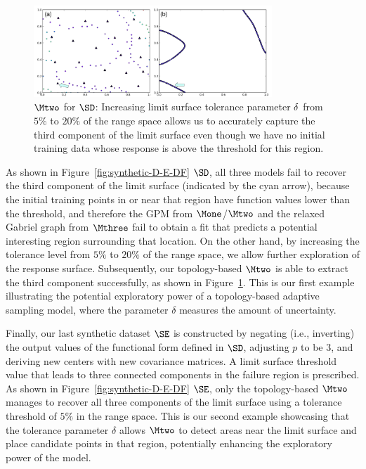 \begin{figure}[ht]
\centering
\includegraphics[width=0.8\textwidth]{figs/chap5/synthetic-D-20percent.pdf}
\caption{
$\protect\Mtwo$ for $\protect\SD$: Increasing limit surface tolerance parameter $\protect\delta$
from $5\%$ to $20\%$ of the range space allows us to accurately capture the third component of the limit surface even though we have no initial training data whose response is above the threshold for this region.
}
\label{fig:df-20percent}
\end{figure}

As shown in Figure~\ref{fig:synthetic-D-E-DF} $\SD$, all three models fail to recover the third component of the limit surface (indicated by the cyan arrow), because the initial training points in or near that region have function values lower than the threshold, and therefore the GPM from $\Mone$/$\Mtwo$ and the relaxed Gabriel graph from $\Mthree$ fail to obtain a fit that predicts a potential interesting region surrounding that location.
%
On the other hand, by increasing the tolerance level from $5\%$ to $20\%$ of the range space,  we allow further exploration of the response surface.
%
Subsequently, our topology-based $\Mtwo$ is able to extract the third component successfully, as shown in Figure~\ref{fig:df-20percent}.
%
This is our first example illustrating the potential exploratory power of a topology-based adaptive sampling model, where the parameter $\delta$ measures the amount of uncertainty.


Finally, our last synthetic dataset $\SE$ is constructed by negating (i.e., inverting) the output values of the functional form defined in $\SD$, adjusting $p$ to be $3$, and deriving new centers with new covariance matrices.
%
A limit surface threshold value that leads to three connected components in the failure region is prescribed.
%
As shown in Figure~\ref{fig:synthetic-D-E-DF} $\SE$, only the topology-based $\Mtwo$ manages to recover all three components of the limit surface using a tolerance threshold of $5\%$ in the range space.
%
This is our second example showcasing that the tolerance parameter $\delta$ allows $\Mtwo$ to detect areas near the limit surface and place candidate points in that region, potentially enhancing the exploratory power of the model.

